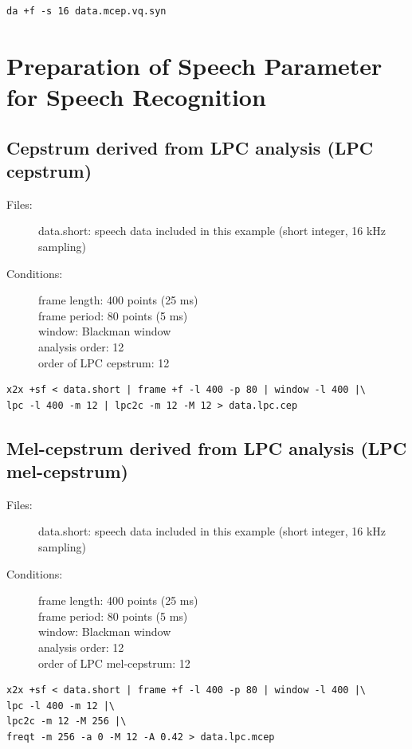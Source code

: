 \documentclass[a4paper,10pt]{article}
\begin{document}
\begin{verbatim}
da +f -s 16 data.mcep.vq.syn
\end{verbatim}

\section{Preparation of Speech Parameter for Speech Recognition}

\subsection{Cepstrum derived from LPC analysis (LPC cepstrum)}

\begin{description}
\item[Files:] 
  data.short: speech data included in this example (short integer, 16 kHz sampling)
\item[Conditions:]
  frame length: 400 points (25 ms)\\
  frame period: 80 points (5 ms)\\
  window: Blackman window\\
  analysis order: 12\\
  order of LPC cepstrum: 12
\end{description}

\begin{verbatim}
x2x +sf < data.short | frame +f -l 400 -p 80 | window -l 400 |\
lpc -l 400 -m 12 | lpc2c -m 12 -M 12 > data.lpc.cep
\end{verbatim}

\subsection{Mel-cepstrum derived from LPC analysis
  (LPC mel-cepstrum)}

\begin{description}
\item[Files:]
  data.short: speech data included in this example (short integer, 16 kHz sampling)
\item[Conditions:]
  frame length: 400 points (25 ms)\\
  frame period: 80 points (5 ms)\\
  window: Blackman window\\
  analysis order: 12\\
  order of LPC mel-cepstrum: 12
\end{description}

\begin{verbatim}
x2x +sf < data.short | frame +f -l 400 -p 80 | window -l 400 |\
lpc -l 400 -m 12 |\
lpc2c -m 12 -M 256 |\
freqt -m 256 -a 0 -M 12 -A 0.42 > data.lpc.mcep
\end{verbatim}
\end{document}
